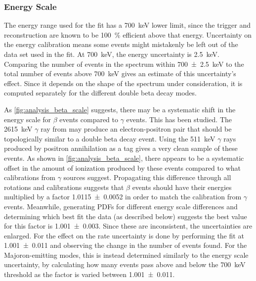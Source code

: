 \documentclass[herrin-thesis.tex]{subfiles}
\begin{document}
\subsubsection{Energy Scale}
The energy range used for the fit has a \SI{700}{\keV} lower limit, since the trigger and reconstruction are known to be \SI{100}{\percent} efficient above that energy. Uncertainty on the energy calibration means some events might mistakenly be left out of the data set used in the fit. At \SI{700}{\keV}, the energy uncertainty is \SI{2.5}{\keV}. Comparing the number of events in the spectrum within \SI{700\pm2.5}{\keV} to the total number of events above \SI{700}{\keV} gives an estimate of this uncertainty's effect. Since it depends on the shape of the spectrum under consideration, it is computed separately for the different double beta decay modes.

As \cref{fig:analysis_beta_scale} suggests, there may be a systematic shift in the energy scale for \(\beta\) events compared to \(\gamma\) events. This has been studied. The \SI{2615}{\keV} \(\gamma\) ray from  may produce an electron-positron pair that should be topologically similar to a double beta decay event. Using the \SI{511}{\keV} \(\gamma\) rays produced by positron annihilation as a tag gives a very clean sample of these events. As shown in \cref{fig:analysis_beta_scale}, there appears to be a systematic offset in the amount of ionization produced by these events compared to what calibrations from \(\gamma\) sources suggest. Propagating this difference through all rotations and calibrations suggests that \(\beta\) events should have their energies multiplied by a factor \num{1.0115\pm0.0052} in order to match the calibration from \(\gamma\) events. Meanwhile, generating PDFs for different energy scale differences and determining which best fit the data (as described below) suggests the best value for this factor is \num{1.001\pm0.003}. Since these are inconsistent, the uncertainties are enlarged. For \twonu{} the effect on the rate uncertainty is done by performing the fit at \num{1.001\pm0.011} and observing the change in the number of events found. For the Majoron-emitting modes, this is instead determined similarly to the energy scale uncertainty, by calculating how many events pass above and below the \SI{700}{\keV} threshold as the factor is varied between \num{1.001\pm0.011}.
\end{document}
